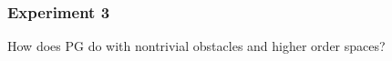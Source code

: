 \documentclass[aspectratio=169,xcolor=dvipsnames,11pt]{beamer}
\begin{document}
\begin{frame}
\begin{figure}
\end{figure}
\end{frame}

\begin{frame}\frametitle{Experiment 3}
\begin{center}
{\color{Maroon} \Large How does PG do with nontrivial obstacles and higher order spaces?}
\end{center}
\end{frame}

\end{document}
